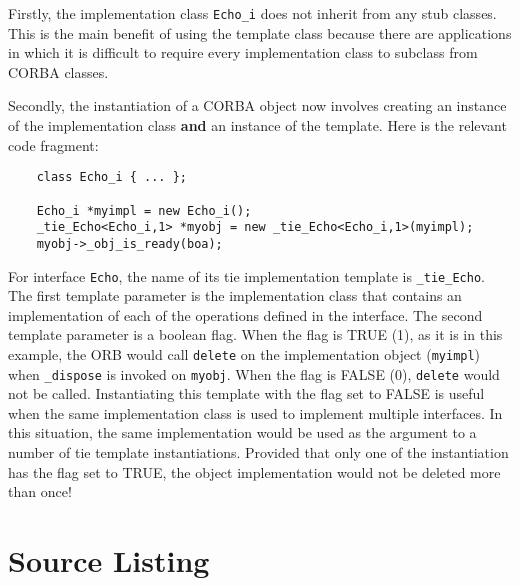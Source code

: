 \documentclass[11pt,twoside,onecolumn]{book}
\begin{document}
Firstly, the implementation class {\tt Echo\_i} does not inherit from any
stub classes. This is the main benefit of using the template class because
there are applications in which it is difficult to require every
implementation class to subclass from CORBA classes.

Secondly, the instantiation of a CORBA object now involves creating an
instance of the implementation class {\bf and} an instance of the template.
Here is the relevant code fragment:

{\small
\begin{verbatim}
    class Echo_i { ... };
   
    Echo_i *myimpl = new Echo_i();
    _tie_Echo<Echo_i,1> *myobj = new _tie_Echo<Echo_i,1>(myimpl);
    myobj->_obj_is_ready(boa);
\end{verbatim}
}

For interface {\tt Echo}, the name of its tie implementation template is
{\tt \_tie\_Echo}. The first template parameter is the implementation class
that contains an implementation of each of the operations defined in the
interface. The second template parameter is a boolean flag. When the flag
is TRUE (1), as it is in this example, the ORB would call {\tt delete} on
the implementation object ({\tt myimpl}) when {\tt \_dispose} is invoked on
{\tt myobj}. When the flag is FALSE (0), {\tt delete} would not be called.
Instantiating this template with the flag set to FALSE is useful when the
same implementation class is used to implement multiple interfaces. In this
situation, the same implementation would be used as the argument to a
number of tie template instantiations. Provided that only one of the
instantiation has the flag set to TRUE, the object implementation would not
be deleted more than once!

\newpage
\section{Source Listing}
\end{document}
